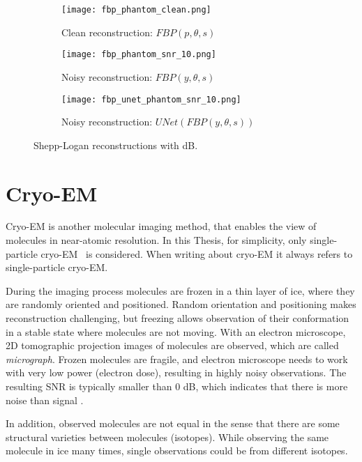 \begin{figure}[H]
    \captionsetup[subfigure]{justification=centering}
    \centering
    \begin{subfigure}[t]{0.3\textwidth}
        \texttt{[image: fbp\_phantom\_clean.png]}
        \caption{Clean reconstruction: $\textit{FBP}(p, \theta, s)$}
        \label{fig:fbp_phantom}
    \end{subfigure}\hfill
    \begin{subfigure}[t]{0.3\textwidth}
      \texttt{[image: fbp\_phantom\_snr\_10.png]}
      \caption{Noisy reconstruction: $\textit{FBP}(y, \theta, s)$}
      \label{fig:fbp_phantom_noisy}
    \end{subfigure}\hfill
    \begin{subfigure}[t]{0.3\textwidth}
      \texttt{[image: fbp\_unet\_phantom\_snr\_10.png]}
      \caption{Noisy reconstruction: $\textit{UNet}(\textit{FBP}(y, \theta, s))$}
      \label{fig:fbp_unet_phantom_noisy}
    \end{subfigure}
    \caption{Shepp-Logan reconstructions with  dB.}
    \label{fig:phantom_fbps}
  \end{figure}


\section{Cryo-EM}
Cryo-EM is another molecular imaging method, that enables the view of molecules in near-atomic resolution.
In this Thesis, for simplicity, only single-particle cryo-EM~\cite{singleParticleCryoEm} is considered.
When writing about cryo-EM it always refers to single-particle cryo-EM.

During the imaging process molecules are frozen in a thin layer of ice, where they are randomly oriented and positioned. 
Random orientation and positioning makes reconstruction challenging, 
but freezing allows observation of their conformation in a stable state where molecules are not moving.
With an electron microscope, 2D tomographic projection images of molecules are observed,
which are called \textit{micrograph}. 
Frozen molecules are fragile, and electron microscope needs to work with
very low power (electron dose), resulting in highly noisy observations. The resulting SNR
is typically smaller than 0 dB, which indicates that there is more noise than signal \cite{cryoEmMath2}.

In addition, observed molecules are not equal in the sense that there are some structural varieties between
molecules (isotopes). While observing the same molecule in ice many times, single observations could be from different isotopes.

